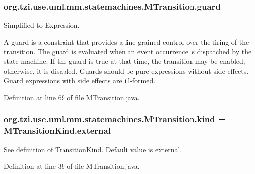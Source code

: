 \hypertarget{classorg_1_1tzi_1_1use_1_1uml_1_1mm_1_1statemachines_1_1_m_transition_a31998277b9bccb7080bf411df6225ad7}{
\subsubsection[{guard}]{ org.\-tzi.\-use.\-uml.\-mm.\-statemachines.\-M\-Transition.\-guard\hspace{0.3cm}{\ttfamily [protected]}}}\label{classorg_1_1tzi_1_1use_1_1uml_1_1mm_1_1statemachines_1_1_m_transition_a31998277b9bccb7080bf411df6225ad7}
Simplified to Expression.

A guard is a constraint that provides a fine-\/grained control over the firing of the transition. The guard is evaluated when an event occurrence is dispatched by the state machine. If the guard is true at that time, the transition may be enabled; otherwise, it is disabled. Guards should be pure expressions without side effects. Guard expressions with side effects are ill-\/formed. 

Definition at line 69 of file M\-Transition.\-java.

\hypertarget{classorg_1_1tzi_1_1use_1_1uml_1_1mm_1_1statemachines_1_1_m_transition_a5ffe3f007d657d19eb79dc32f3cca30e}{
\subsubsection[{kind}]{ org.\-tzi.\-use.\-uml.\-mm.\-statemachines.\-M\-Transition.\-kind = {\bf M\-Transition\-Kind.\-external}\hspace{0.3cm}{\ttfamily [protected]}}}\label{classorg_1_1tzi_1_1use_1_1uml_1_1mm_1_1statemachines_1_1_m_transition_a5ffe3f007d657d19eb79dc32f3cca30e}
See definition of Transition\-Kind. Default value is external. 

Definition at line 39 of file M\-Transition.\-java.

